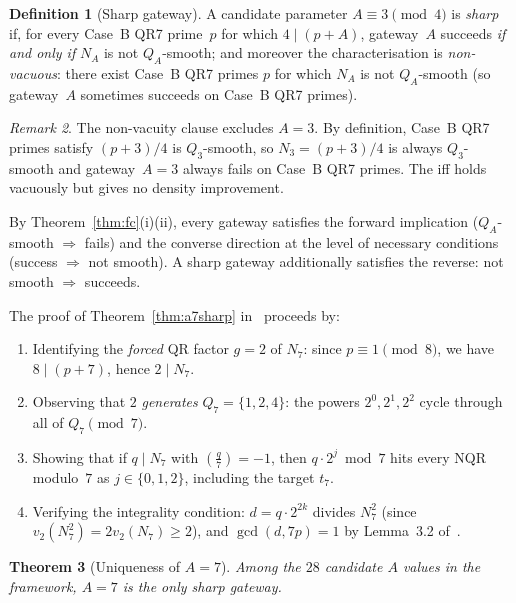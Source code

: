 \documentclass[12pt]{amsart}
\newtheorem{theorem}{Theorem}[section]
\theoremstyle{definition}
\newtheorem{definition}[theorem]{Definition}
\theoremstyle{remark}
\newtheorem{remark}[theorem]{Remark}
\newcommand{\leg}[2]{\left(\frac{#1}{#2}\right)}
\begin{document}
\begin{definition}[Sharp gateway]
A candidate parameter $A \equiv 3 \pmod{4}$ is \emph{sharp} if,
for every Case~B QR7 prime~$p$ for which $4 \mid (p+A)$,
gateway~$A$ succeeds \emph{if and only if} $N_A$ is not $Q_A$-smooth;
and moreover the characterisation is \emph{non-vacuous}: there exist
Case~B QR7 primes $p$ for which $N_A$ is not $Q_A$-smooth
(so gateway~$A$ sometimes succeeds on Case~B QR7 primes).
\end{definition}

\begin{remark}
The non-vacuity clause excludes $A = 3$.
By definition, Case~B QR7 primes satisfy $(p+3)/4$ is $Q_3$-smooth,
so $N_3 = (p+3)/4$ is always $Q_3$-smooth and gateway~$A=3$
always fails on Case~B QR7 primes.
The iff holds vacuously but gives no density improvement.
\end{remark}

By Theorem~\ref{thm:fc}(i)(ii), every gateway satisfies the forward
implication ($Q_A$-smooth $\Rightarrow$ fails) and the converse direction
at the level of necessary conditions (success $\Rightarrow$ not smooth).
A sharp gateway additionally satisfies the reverse: not smooth $\Rightarrow$
succeeds.

The proof of Theorem~\ref{thm:a7sharp} in~\cite{closure-paper} proceeds by:
\begin{enumerate}
  \item Identifying the \emph{forced} QR factor $g = 2$ of $N_7$:
    since $p \equiv 1 \pmod{8}$, we have $8 \mid (p+7)$, hence $2 \mid N_7$.
  \item Observing that $2$ \emph{generates} $Q_7 = \{1,2,4\}$:
    the powers $2^0, 2^1, 2^2$ cycle through all of $Q_7 \pmod{7}$.
  \item Showing that if $q \mid N_7$ with $\leg{q}{7} = -1$, then
    $q \cdot 2^j \bmod 7$ hits every NQR modulo~$7$ as $j \in \{0,1,2\}$,
    including the target $t_7$.
  \item Verifying the integrality condition: $d = q \cdot 2^{2k}$
    divides $N_7^2$ (since $v_2(N_7^2) = 2v_2(N_7) \ge 2$),
    and $\gcd(d, 7p) = 1$ by Lemma~3.2 of~\cite{ES-paper}.
\end{enumerate}

\begin{theorem}[Uniqueness of $A=7$]\label{thm:unique}
Among the $28$ candidate $A$ values in the framework,
$A = 7$ is the only sharp gateway.
\end{theorem}
\end{document}
